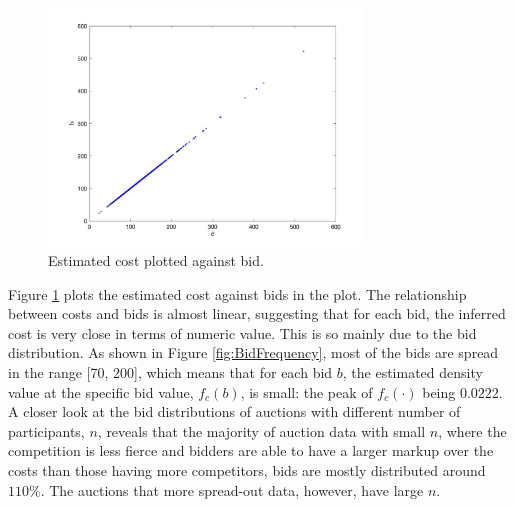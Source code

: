 \documentclass[11pt]{article}
\begin{document}
\begin{figure}[h]
    \includegraphics[width=0.75\textwidth]{cost_bid.jpg}
    \centering
    \caption{Estimated cost plotted against bid.}
   
    \label{fig:cost_bid}
\end{figure}

Figure \ref{fig:cost_bid} plots the estimated cost against bids in the plot. 
The relationship between costs and bids is almost linear, suggesting that for 
each bid, the inferred cost is very close in terms of numeric value. This is so 
mainly due to the bid distribution. As shown in Figure \ref{fig:BidFrequency}, 
most of the bids are spread in the range [70, 200], which means that for each 
bid $b$, the estimated density value at the specific bid value, $f_c(b)$, is 
small: the peak of $f_c(\cdot)$ being $0.0222$. A closer look at the bid 
distributions of auctions with different number of participants, $n$, reveals 
that the majority of auction data with small $n$, where the competition is less 
fierce and bidders are able to have a larger markup over the costs than those 
having more competitors, bids are mostly distributed around $110\%$. The 
auctions that more spread-out data, however, have large $n$. 
\end{document}
